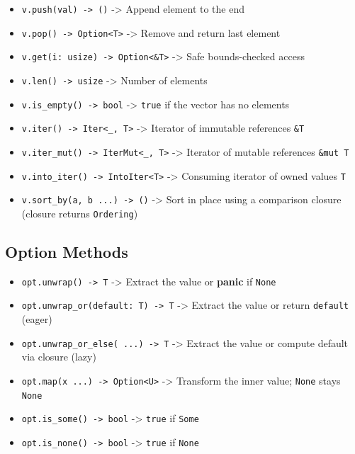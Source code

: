 \documentclass[
  11pt,
]{article}
\providecommand{\tightlist}{%
  \setlength{\itemsep}{0pt}\setlength{\parskip}{0pt}}
\begin{document}
\begin{itemize}
\tightlist
\item
  \texttt{v.push(val)\ -\textgreater{}\ ()} -\textgreater{} Append
  element to the end
\item
  \texttt{v.pop()\ -\textgreater{}\ Option\textless{}T\textgreater{}}
  -\textgreater{} Remove and return last element
\item
  \texttt{v.get(i:\ usize)\ -\textgreater{}\ Option\textless{}\&T\textgreater{}}
  -\textgreater{} Safe bounds-checked access
\item
  \texttt{v.len()\ -\textgreater{}\ usize} -\textgreater{} Number of
  elements
\item
  \texttt{v.is\_empty()\ -\textgreater{}\ bool} -\textgreater{}
  \texttt{true} if the vector has no elements
\item
  \texttt{v.iter()\ -\textgreater{}\ Iter\textless{}\textquotesingle{}\_,\ T\textgreater{}}
  -\textgreater{} Iterator of immutable references \texttt{\&T}
\item
  \texttt{v.iter\_mut()\ -\textgreater{}\ IterMut\textless{}\textquotesingle{}\_,\ T\textgreater{}}
  -\textgreater{} Iterator of mutable references \texttt{\&mut\ T}
\item
  \texttt{v.into\_iter()\ -\textgreater{}\ IntoIter\textless{}T\textgreater{}}
  -\textgreater{} Consuming iterator of owned values \texttt{T}
\item
  \texttt{v.sort\_by(\textbar{}a,\ b\textbar{}\ ...)\ -\textgreater{}\ ()}
  -\textgreater{} Sort in place using a comparison closure (closure
  returns \texttt{Ordering})
\end{itemize}

\subsection{Option Methods}\label{option-methods}

\begin{itemize}
\tightlist
\item
  \texttt{opt.unwrap()\ -\textgreater{}\ T} -\textgreater{} Extract the
  value or \textbf{panic} if \texttt{None}
\item
  \texttt{opt.unwrap\_or(default:\ T)\ -\textgreater{}\ T}
  -\textgreater{} Extract the value or return \texttt{default} (eager)
\item
  \texttt{opt.unwrap\_or\_else(\textbar{}\textbar{}\ ...)\ -\textgreater{}\ T}
  -\textgreater{} Extract the value or compute default via closure
  (lazy)
\item
  \texttt{opt.map(\textbar{}x\textbar{}\ ...)\ -\textgreater{}\ Option\textless{}U\textgreater{}}
  -\textgreater{} Transform the inner value; \texttt{None} stays
  \texttt{None}
\item
  \texttt{opt.is\_some()\ -\textgreater{}\ bool} -\textgreater{}
  \texttt{true} if \texttt{Some}
\item
  \texttt{opt.is\_none()\ -\textgreater{}\ bool} -\textgreater{}
  \texttt{true} if \texttt{None}
\end{itemize}
\end{document}
